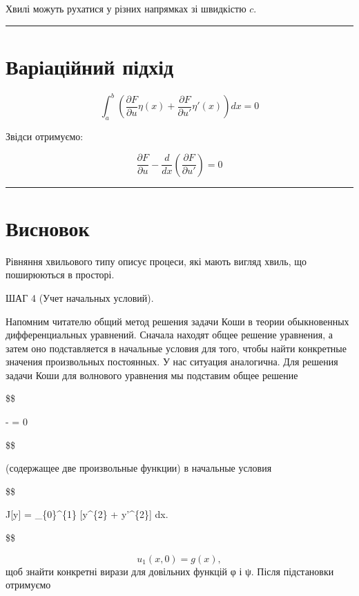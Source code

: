 \documentclass[
  ukrainian,
]{article}
\begin{document}
Хвилі можуть рухатися у різних напрямках зі швидкістю \(c\).

\begin{center}\rule{0.5\linewidth}{0.5pt}\end{center}

\section{Варіаційний
підхід}\label{ux432ux430ux440ux456ux430ux446ux456ux439ux43dux438ux439-ux43fux456ux434ux445ux456ux434}

\[
\int_a^b \left( \frac{\partial F}{\partial u} \eta(x) + \frac{\partial F}{\partial u'} \eta'(x) \right) dx = 0
\]

Звідси отримуємо:

\[
\frac{\partial F}{\partial u} - \frac{d}{dx}\left( \frac{\partial F}{\partial u'} \right) = 0
\]

\begin{center}\rule{0.5\linewidth}{0.5pt}\end{center}

\section{Висновок}\label{ux432ux438ux441ux43dux43eux432ux43eux43a-1}

Рівняння хвильового типу описує процеси, які мають вигляд хвиль, що
поширюються в просторі.

ШАГ 4 (Учет начальных условий).

Напомним читателю общий метод решения задачи Коши в теории обыкновенных
дифференциальных уравнений. Сначала находят общее решение уравнения, а
затем оно подставляется в начальные условия для того, чтобы найти
конкретные значения произвольных постоянных. У нас ситуация аналогична.
Для решения задачи Коши для волнового уравнения мы подставим общее
решение

\$\$

 - 
 = 0

\$\$

(содержащее две произвольные функции) в начальные условия

\$\$

J{[}y{]} = \int\_\{0\}\^{}\{1\} {[}y\^{}\{2\} + y'\^{}\{2\}{]} dx.

\$\$

\[ u_1(x, 0) = g(x), \] щоб знайти конкретні вирази для довільних
функцій φ і ψ. Після підстановки отримуємо
\end{document}
